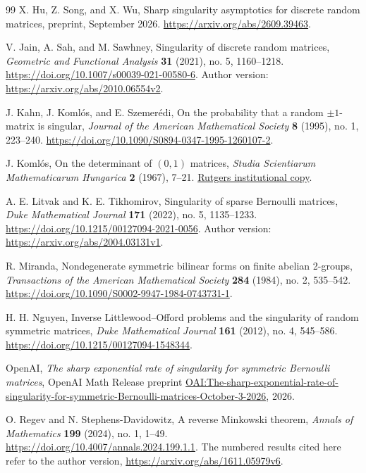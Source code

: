 \begin{thebibliography}{99}
X. Hu, Z. Song, and X. Wu,
Sharp singularity asymptotics for discrete random matrices,
preprint, September 2026.
\url{https://arxiv.org/abs/2609.39463}.

V. Jain, A. Sah, and M. Sawhney,
Singularity of discrete random matrices,
\emph{Geometric and Functional Analysis} \textbf{31} (2021), no. 5,
1160--1218.
\url{https://doi.org/10.1007/s00039-021-00580-6}.
Author version: \url{https://arxiv.org/abs/2010.06554v2}.

J. Kahn, J. Koml\'os, and E. Szemer\'edi,
On the probability that a random \(\pm1\)-matrix is singular,
\emph{Journal of the American Mathematical Society} \textbf{8}
(1995), no. 1, 223--240.
\url{https://doi.org/10.1090/S0894-0347-1995-1260107-2}.

J. Koml\'os,
On the determinant of \((0,1)\) matrices,
\emph{Studia Scientiarum Mathematicarum Hungarica} \textbf{2} (1967),
7--21.
\href{https://scholarship.libraries.rutgers.edu/esploro/outputs/journalArticle/On-the-determinant-of-0-1-matrices/991031550043104646}{Rutgers institutional copy}.

A. E. Litvak and K. E. Tikhomirov,
Singularity of sparse Bernoulli matrices,
\emph{Duke Mathematical Journal} \textbf{171} (2022), no. 5,
1135--1233.
\url{https://doi.org/10.1215/00127094-2021-0056}.
Author version: \url{https://arxiv.org/abs/2004.03131v1}.

R. Miranda,
Nondegenerate symmetric bilinear forms on finite abelian 2-groups,
\emph{Transactions of the American Mathematical Society} \textbf{284}
(1984), no. 2, 535--542.
\url{https://doi.org/10.1090/S0002-9947-1984-0743731-1}.

H. H. Nguyen,
Inverse Littlewood--Offord problems and the singularity of random symmetric matrices,
\emph{Duke Mathematical Journal} \textbf{161} (2012), no. 4, 545--586.
\url{https://doi.org/10.1215/00127094-1548344}.

OpenAI,
\emph{The sharp exponential rate of singularity for symmetric Bernoulli matrices},
OpenAI Math Release preprint
\href{https://github.com/openai/math/blob/main/preprints/The-sharp-exponential-rate-of-singularity-for-symmetric-Bernoulli-matrices-October-3-2026/symmetric-bernoulli-singularity.pdf}{OAI:The-sharp-exponential-rate-of-singularity-for-symmetric-Bernoulli-matrices-October-3-2026},
2026.

O. Regev and N. Stephens-Davidowitz,
A reverse Minkowski theorem,
\emph{Annals of Mathematics} \textbf{199} (2024), no. 1, 1--49.
\url{https://doi.org/10.4007/annals.2024.199.1.1}.
The numbered results cited here refer to the author version,
\url{https://arxiv.org/abs/1611.05979v6}.


\end{thebibliography}

